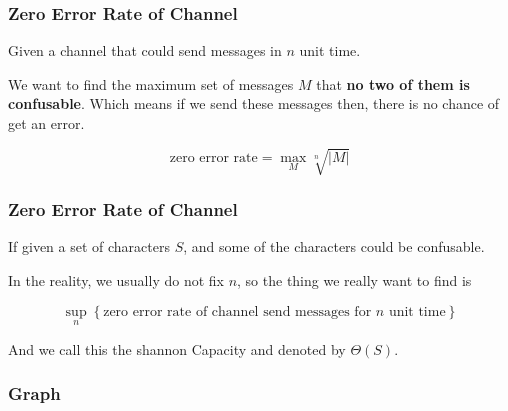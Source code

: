       \begin{frame}
            \frametitle{Zero Error Rate of Channel}
            \begin{definition}
                  Given a channel that could send messages in $n$ unit time.

                  We want to find the maximum set of messages $M$ that \textbf{no two of them is confusable}.
                  Which means if we send these messages then, there is no chance of get an error.

                  \begin{equation}
                        \text{zero error rate} = \max_{M} \sqrt[n]{|M|}
                  \end{equation}
            \end{definition}
      \end{frame}

      \begin{frame}
            \frametitle{Zero Error Rate of Channel}
            
            \begin{definition}
                  If given a set of characters $S$, and some of the characters could be confusable.

                  In the reality, we usually do not fix $n$, so the thing we really want to find is
                  
                  \begin{equation}
                        \sup_{n} \left\{
                              \text{zero error rate of channel send messages for $n$ unit time}
                        \right\}
                  \end{equation}

                  And we call this the shannon Capacity and denoted by $\Theta(S)$.
            \end{definition}
      \end{frame}

\subsubsection*{Graph}

